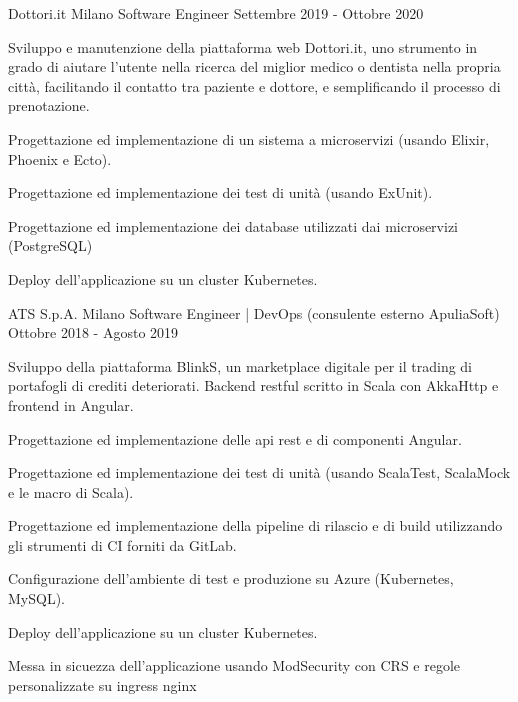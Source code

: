 \documentclass{resume} %
\begin{document}
\cvEntry
  {Dottori.it}
  {Milano}
  {Software Engineer}
  {Settembre 2019 - Ottobre 2020}{
    \begin{cvEntryItems}
      \item Sviluppo e manutenzione della piattaforma web Dottori.it, uno strumento in grado
            di aiutare l'utente nella ricerca del miglior medico o dentista nella propria
            citt\`a, facilitando il contatto tra paziente e dottore, e semplificando il
            processo di prenotazione.
      \item Progettazione ed implementazione di un sistema a microservizi (usando Elixir,
            Phoenix e Ecto).
      \item Progettazione ed implementazione dei test di unit\`a (usando ExUnit).
      \item Progettazione ed implementazione dei database utilizzati dai microservizi (PostgreSQL)
      \item Deploy dell'applicazione su un cluster Kubernetes.
    \end{cvEntryItems}
}


\cvEntry
  {ATS S.p.A.}
  {Milano}
  {Software Engineer | DevOps (consulente esterno ApuliaSoft)}
  {Ottobre 2018 - Agosto 2019}{
    \begin{cvEntryItems}
      \item Sviluppo della piattaforma BlinkS, un marketplace digitale per il trading di
            portafogli di crediti deteriorati. Backend restful scritto in Scala con AkkaHttp
            e frontend in Angular.
      \item Progettazione ed implementazione delle api rest e di componenti Angular.
      \item Progettazione ed implementazione dei test di unit\`a (usando ScalaTest, ScalaMock
            e le macro di Scala).
      \item Progettazione ed implementazione della pipeline di rilascio e di build utilizzando
            gli strumenti di CI forniti da GitLab.
      \item Configurazione dell'ambiente di test e produzione su Azure (Kubernetes, MySQL).
      \item Deploy dell'applicazione su un cluster Kubernetes.
      \item Messa in sicuezza dell'applicazione usando ModSecurity con CRS e regole personalizzate
            su ingress nginx
    \end{cvEntryItems}
}
\end{document}
